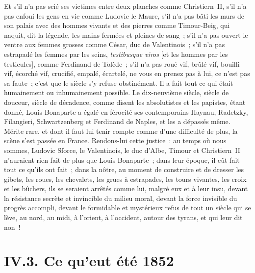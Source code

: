 \documentclass[french,twoside]{book} %
\begin{document}
Et s’il n’a pas scié ses victimes entre deux planches comme Christiern II, s’il n’a pas enfoui les gens en vie comme Ludovic le Maure, s’il n’a pas bâti les murs de son palais avec des hommes vivants et des pierres comme Timour-Beig, qui naquit, dit la légende, les mains fermées et pleines de sang ; s’il n’a pas ouvert le ventre aux femmes grosses comme César, duc de Valentinois ; s’il n’a pas estrapadé les femmes par les seins, \emph{testibusque viros} [et les hommes par les testicules], comme Ferdinand de Tolède ; s’il n’a pas roué vif, brûlé vif, bouilli vif, écorché vif, crucifié, empalé, écartelé, ne vous en prenez pas à lui, ce n’est pas sa faute ; c’est que le siècle s’y refuse obstinément. Il a fait tout ce qui était humainement ou inhumainement possible. Le dix-neuvième siècle, siècle de douceur, siècle de décadence, comme disent les absolutistes et les papistes, étant donné, Louis Bonaparte a égalé en férocité ses contemporains Haynau, Radetzky, Filangieri, Schwartzenberg et Ferdinand de Naples, et les a dépassés même. Mérite rare, et dont il faut lui tenir compte comme d’une difficulté de plus, la scène s’est passée en France. Rendons-lui cette justice : au temps où nous sommes, Ludovic Sforce, le Valentinois, le duc d’Albe, Timour et Christiern II n’auraient rien fait de plus que Louis Bonaparte ; dans leur époque, il eût fait tout ce qu’ils ont fait ; dans la nôtre, au moment de construire et de dresser les gibets, les roues, les chevalets, les grues à estrapades, les tours vivantes, les croix et les bûchers, ils se seraient arrêtés comme lui, malgré eux et à leur insu, devant la résistance secrète et invincible du milieu moral, devant la force invisible du progrès accompli, devant le formidable et mystérieux refus de tout un siècle qui se lève, au nord, au midi, à l’orient, à l’occident, autour des tyrans, et qui leur dit non !

\section[{IV.3. Ce qu’eut été 1852}]{IV.3. Ce qu’eut été 1852}
\end{document}
